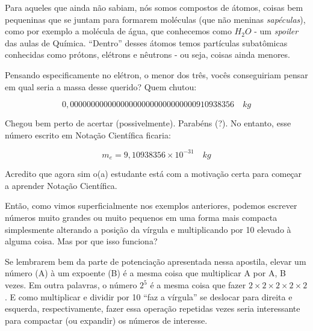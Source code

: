 Para aqueles que ainda não sabiam, nós somos compostos de átomos, coisas bem pequeninas que se juntam para formarem moléculas (que não meninas \textit{sapéculas}), como por exemplo a molécula de água, que conhecemos como \(H_2O\) - um \textit{spoiler} das aulas de Química. ``Dentro'' desses átomos temos partículas subatômicas conhecidas como prótons, elétrons e nêutrons - ou seja, coisas ainda menores. 

Pensando especificamente no elétron, o menor dos três, vocês conseguiriam pensar em qual seria a massa desse querido? Quem chutou:

\begin{equation}
    0,000000000000000000000000000000910938356 \quad kg
\end{equation}

Chegou bem perto de acertar (possivelmente). Parabéns (?). No entanto, esse número escrito em Notação Científica ficaria:

\begin{equation}
    m_e=9,10938356\times10^{-31} \quad kg
\end{equation}

Acredito que agora sim o(a) estudante está com a motivação certa para começar a aprender Notação Científica.

Então, como vimos superficialmente nos exemplos anteriores, podemos escrever números muito grandes ou muito pequenos em uma forma mais compacta simplesmente alterando a posição da vírgula e multiplicando por 10 elevado à alguma coisa. Mas por que isso funciona? 

Se lembrarem bem da parte de potenciação apresentada nessa apostila, elevar um número (A) à um expoente (B) é a mesma coisa que multiplicar A por A, B vezes. Em outra palavras, o número \(2^5\) é a mesma coisa que fazer \(2\times2\times2\times2\times2\). E como multiplicar e dividir por 10 ``faz a vírgula'' se deslocar para direita e esquerda, respectivamente, fazer essa operação repetidas vezes seria interessante para compactar (ou expandir) os números de interesse.

